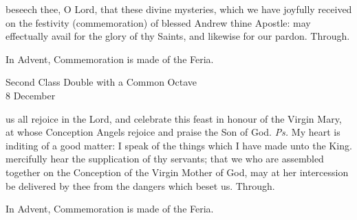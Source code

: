 \postcommunion
{} beseech thee, O Lord, that these divine mysteries, which we have joyfully received on the festivity (commemoration) of blessed Andrew thine Apostle: may effectually avail for the glory of thy Saints, and likewise for our pardon. Through.
\begin{rubric}
    In Advent, Commemoration is made of the Feria.
\end{rubric}

\begin{inhead}
    {Second Class Double with a Common Octave\\
8 December}
\end{inhead}
\par\noindent
{}



\introit
{} us all rejoice in the Lord, and celebrate this feast in honour of the Virgin Mary, at whose Conception Angels rejoice and praise the Son of God. \textit{Ps.} My heart is inditing of a good matter: I speak of the things which I have made unto the King.
\collect
{} mercifully hear the supplication of thy servants; that we who are assembled together on the Conception of the Virgin Mother of God, may at her intercession be delivered by thee from the dangers which beset us. Through.
\begin{rubric}
    In Advent, Commemoration is made of the Feria.
\end{rubric}

